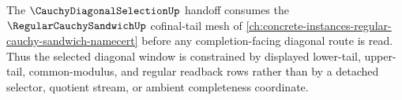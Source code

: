 The $\CauchyDiagonalSelectionUp$ handoff consumes the $\RegularCauchySandwichUp$ cofinal-tail mesh of \autoref{ch:concrete-instances-regular-cauchy-sandwich-namecert} before any completion-facing diagonal route is read. Thus the selected diagonal window is constrained by displayed lower-tail, upper-tail, common-modulus, and regular readback rows rather than by a detached selector, quotient stream, or ambient completeness coordinate.
